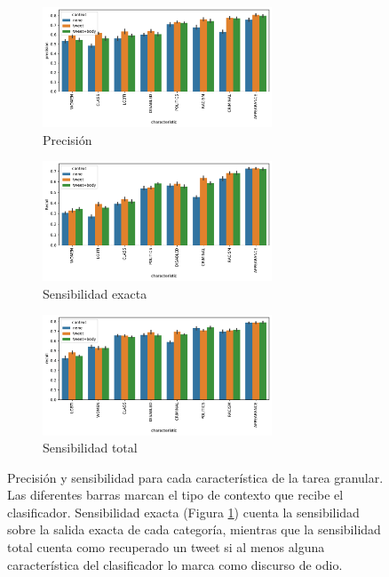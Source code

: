 \begin{figure}[ht!]
    \centering
    \small
    \begin{subfigure}[b]{\textwidth}
        \centering
        \caption{Precisión}
        \includegraphics[width=0.75\textwidth]{img/06/precision_barplot.pdf}

    \end{subfigure}
    \begin{subfigure}[b]{\textwidth}
        \centering
        \caption{Sensibilidad exacta}
        \includegraphics[width=0.75\textwidth]{img/06/exact_recall_barplot.pdf}

        \label{subfig:exact_recall}
    \end{subfigure}
    \begin{subfigure}[b]{\textwidth}
        \centering
        \caption{Sensibilidad total}
        \includegraphics[width=0.75\textwidth]{img/06/hate_recall_barplot.pdf}

        \label{subfig:total_recall}
    \end{subfigure}
    \caption{Precisión y sensibilidad para cada característica de la tarea granular. Las diferentes barras marcan el tipo de contexto que recibe el clasificador. Sensibilidad exacta (Figura \ref{subfig:exact_recall}) cuenta la sensibilidad sobre la salida exacta de cada categoría, mientras que la sensibilidad total cuenta como recuperado un tweet si al menos alguna característica del clasificador lo marca como discurso de odio.}
    \label{fig:precision_recall}
\end{figure}


